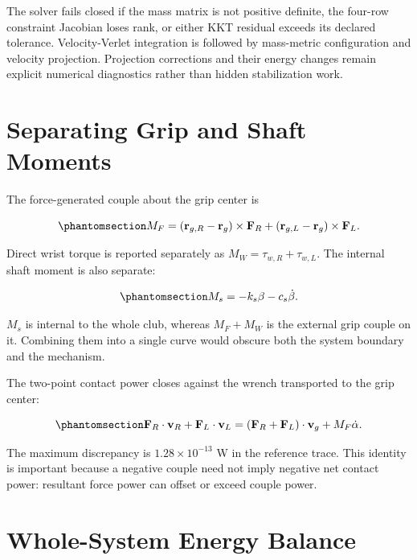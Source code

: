 \documentclass[
  letterpaper,
]{report}
\begin{document}
The solver fails closed if the mass matrix is not positive definite, the
four-row constraint Jacobian loses rank, or either KKT residual exceeds
its declared tolerance. Velocity-Verlet integration is followed by
mass-metric configuration and velocity projection. Projection
corrections and their energy changes remain explicit numerical
diagnostics rather than hidden stabilization work.

\section{Separating Grip and Shaft Moments}\label{sec-coupled-wrenches}

The force-generated couple about the grip center is

\begin{equation}\phantomsection\label{eq-coupled-force-couple}{
M_F=(\mathbf r_{g,R}-\mathbf r_g)\times\mathbf F_R
+(\mathbf r_{g,L}-\mathbf r_g)\times\mathbf F_L.
}\end{equation}

Direct wrist torque is reported separately as
\(M_W=\tau_{w,R}+\tau_{w,L}\). The internal shaft moment is also
separate:

\begin{equation}\phantomsection\label{eq-coupled-shaft-moment}{
M_s=-k_s\beta-c_s\dot\beta.
}\end{equation}

\(M_s\) is internal to the whole club, whereas \(M_F+M_W\) is the
external grip couple on it. Combining them into a single curve would
obscure both the system boundary and the mechanism.

The two-point contact power closes against the wrench transported to the
grip center:

\begin{equation}\phantomsection\label{eq-coupled-power-identity}{
\mathbf F_R\cdot\mathbf v_R+
\mathbf F_L\cdot\mathbf v_L
=(\mathbf F_R+\mathbf F_L)\cdot\mathbf v_g+M_F\dot\alpha.
}\end{equation}

The maximum discrepancy is \(1.28\times10^{-13}\) W in the reference
trace. This identity is important because a negative couple need not
imply negative net contact power: resultant force power can offset or
exceed couple power.

\section{Whole-System Energy Balance}\label{sec-coupled-energy}
\end{document}
